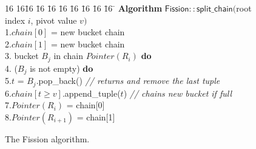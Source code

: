 \begin{figure}[t]
\begin{minipage}{4in}
{\small
\begin{tabbing}
16 16\= 16 \= 16 \= 16 \= 16 \= 16 \= 16 \= 16 \= 16 \= \kill
{\bf Algorithm} $\mathsf{Fission::split\_chain}($root index $i$, pivot value $v)$\\
1.\>$chain[0]$ = new bucket chain\\
2.\>$chain[1]$ = new bucket chain\\
3. bucket $B_j$ in chain $Pointer(R_i)$ {\bf do}\\
4.\> ($B_j$ is not empty) {\bf do}\\
5.\>\>\>$t$ = $B_j$.pop\_back() {\it // returns and remove the last tuple}\\
6.\>\>\>$chain[t \ge v]$.append\_tuple($t$) {\it // chains new bucket if full}\\
7.\>$Pointer(R_i)$ = chain[0]\\
8.\>$Pointer(R_{i+1})$ = chain[1]
\end{tabbing}
}
\end{minipage}
\vspace{-1em}
\caption{The Fission algorithm.}\label{algo:fission}
\vspace{-1.5em}
\end{figure}

